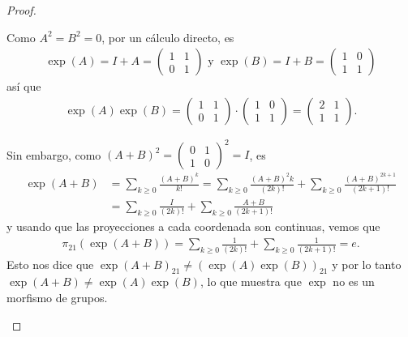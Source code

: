 \documentclass[11pt]{article}
\begin{document}
\begin{proof}
\begin{itemize}[listparindent = \parindent]
Como $A^2 = B^2 = 0$, por un c\'alculo directo, es
\begin{align*}
\exp(A) = I + A = \begin{pmatrix}
1 & 1\\
0 & 1
\end{pmatrix} \text{ y } \exp(B) = I + B = \begin{pmatrix}
1 & 0\\
1 & 1
\end{pmatrix}
\end{align*}
as\'i que 
\begin{align*}
\exp(A)\exp(B) = \begin{pmatrix}
1 & 1\\
0 & 1
\end{pmatrix} \cdot \begin{pmatrix}
1 & 0\\
1 & 1
\end{pmatrix} = \begin{pmatrix}
2 & 1\\
1 & 1
\end{pmatrix}.
\end{align*}

Sin embargo, como $(A+B)^2 = \begin{pmatrix}
0 & 1\\
1 & 0
\end{pmatrix}^2 = I$, es
\begin{align*}
\exp(A+B) &= \sum_{k \geq 0}\frac{(A+B)^k}{k!} = \sum_{k \geq 0}\frac{(A+B)^2k}{(2k)!} + \sum_{k \geq 0}\frac{(A+B)^{2k+1}}{(2k+1)!}\\
&= \sum_{k \geq 0}\frac{I}{(2k)!} + \sum_{k \geq 0}\frac{A+B}{(2k+1)!}
\end{align*}
y usando que las proyecciones a cada coordenada son continuas, vemos que
\begin{align*}
\pi_{21}(\exp(A+B)) = \sum_{k \geq 0}\frac{1}{(2k)!} + \sum_{k \geq 0}\frac{1}{(2k+1)!} = e.
\end{align*}
Esto nos dice que $\exp(A+B)_{21} \neq (\exp(A)\exp(B))_{21}$ y por lo tanto $\exp(A+B) \neq \exp(A)\exp(B)$, lo que muestra que $\exp$ no es un morfismo de grupos.
\end{itemize}
\end{proof}
\end{document}
